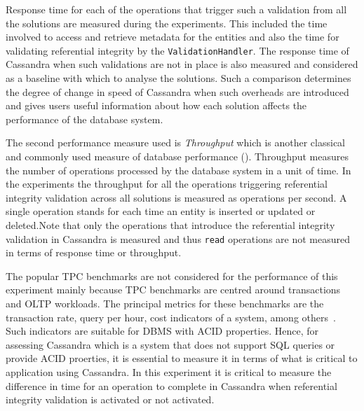 Response time for each of the  operations that trigger such a validation from
all the solutions are measured during the experiments.
This included the time involved to access and retrieve metadata for the entities
and also the time for validating referential integrity by the
\texttt{ValidationHandler}. The response time of Cassandra when such validations
are not in place is also measured and considered as a baseline with which to
analyse the solutions. Such a comparison determines the degree of change in
speed of Cassandra when such overheads are introduced and gives users useful
information about how each solution affects the performance of the database
system.

The second performance measure used is \textit{Throughput} which is another
classical and commonly used measure of database performance (). Throughput measures the number of operations processed by the
database system in a unit of time. In the experiments the throughput for all the
operations triggering referential integrity validation across all solutions is
measured as operations per second. A single operation stands for each time an
entity is inserted or updated or deleted.Note that only the operations that
introduce the referential integrity validation in Cassandra is measured and thus
\texttt{read} operations are not measured in terms of response time or
throughput.

The popular TPC benchmarks are not considered for the performance of this
experiment mainly because TPC benchmarks are centred around transactions and
OLTP workloads. The principal metrics for these benchmarks are the
transaction rate, query per hour, cost indicators of a system, among
others~\citep{TPC}.
Such indicators are suitable for \ac{DBMS} with ACID properties. Hence, for
assessing Cassandra which is a system that does not support SQL queries or
provide ACID proerties, it is essential to measure it in terms of what is
critical to application  using Cassandra. In this experiment it is critical to
measure the difference in time for an operation to complete in Cassandra when
referential integrity validation is activated or not activated.




